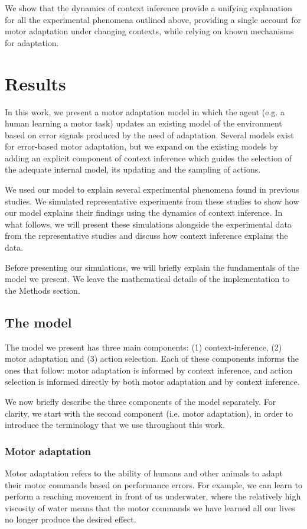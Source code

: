 \documentclass[a4paper,doc,floatsintext,natbib]{apa6}
\begin{document}
We show that the dynamics of context inference provide a unifying explanation for all the experimental phenomena outlined above, providing a single account for motor adaptation under changing contexts, while relying on known mechanisms for adaptation.

\section{Results}
In this work, we present a motor adaptation model in which the agent (e.g. a human learning a motor task) updates an existing model of the environment based on error signals produced by the need of adaptation. Several models exist for error-based motor adaptation, but we expand on the existing models by adding an explicit component of context inference which guides the selection of the adequate internal model, its updating and the sampling of actions.

We used our model to explain several experimental phenomena found in previous studies. We simulated representative experiments from these studies to show how our model explains their findings using the dynamics of context inference. In what follows, we will present these simulations alongside the experimental data from the representative studies and discuss how context inference explains the data.

Before presenting our simulations, we will briefly explain the fundamentals of the model we present. We leave the mathematical details of the implementation to the Methods section.

\subsection{The model}
The model we present has three main components: (1) context-inference, (2) motor adaptation and (3) action selection. Each of these components informs the ones that follow: motor adaptation is informed by context inference, and action selection is informed directly by both motor adaptation and by context inference.

We now briefly describe the three components of the model separately. For clarity, we start with the second component (i.e. motor adaptation), in order to introduce the terminology that we use throughout this work.

\subsubsection{Motor adaptation}
Motor adaptation refers to the ability of humans and other animals to adapt their motor commands based on performance errors. For example, we can learn to perform a reaching movement in front of us underwater, where the relatively high viscosity of water means that the motor commands we have learned all our lives no longer produce the desired effect.
\end{document}
